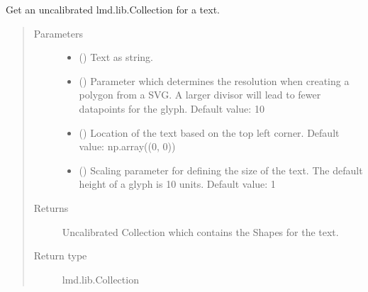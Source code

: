 \documentclass[a4paper,10pt,english,openany,oneside]{sphinxmanual}
\begin{document}

\begin{fulllineitems}
\label{\detokenize{pages/modules:lmd.tools.text}}
\sphinxAtStartPar
Get an uncalibrated lmd.lib.Collection for a text.
\begin{quote}\begin{description}
\item[{Parameters}] \leavevmode\begin{itemize}
\item {} 
\sphinxAtStartPar
{} () \textendash{} Text as string.

\item {} 
\sphinxAtStartPar
{} () \textendash{} Parameter which determines the resolution when creating a polygon from a SVG. A larger divisor will lead to fewer datapoints for the glyph. Default value: 10

\item {} 
\sphinxAtStartPar
{} () \textendash{} Location of the text based on the top left corner. Default value: np.array((0, 0))

\item {} 
\sphinxAtStartPar
{} () \textendash{} Scaling parameter for defining the size of the text. The default height of a glyph is 10 units. Default value: 1

\end{itemize}

\item[{Returns}] \leavevmode
\sphinxAtStartPar
Uncalibrated Collection which contains the Shapes for the text.

\item[{Return type}] \leavevmode
\sphinxAtStartPar
lmd.lib.Collection


\end{description}
\end{quote}
\end{fulllineitems}
\end{document}

